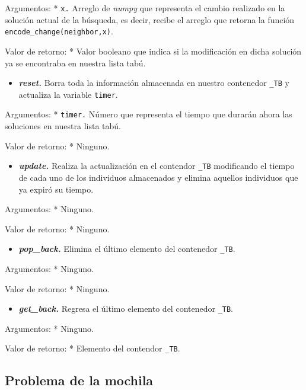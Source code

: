 \documentclass[11pt]{article}
\providecommand{\tightlist}{%
      \setlength{\itemsep}{0pt}\setlength{\parskip}{0pt}}
\begin{document}
Argumentos: * \texttt{x.} Arreglo de \emph{numpy} que representa el
cambio realizado en la solución actual de la búsqueda, es decir, recibe
el arreglo que retorna la función \texttt{encode\_change(neighbor,x)}.

Valor de retorno: * Valor booleano que indica si la modificación en
dicha solución ya se encontraba en nuestra lista tabú.

\begin{itemize}
\tightlist
\item
  \emph{\textbf{reset.}} Borra toda la información almacenada en nuestro
  contenedor \texttt{\_TB} y actualiza la variable \texttt{timer}.
\end{itemize}

Argumentos: * \texttt{timer.} Número que representa el tiempo que
durarán ahora las soluciones en nuestra lista tabú.

Valor de retorno: * Ninguno.

\begin{itemize}
\tightlist
\item
  \emph{\textbf{update.}} Realiza la actualización en el contendor
  \texttt{\_TB} modificando el tiempo de cada uno de los individuos
  almacenados y elimina aquellos individuos que ya expiró su tiempo.
\end{itemize}

Argumentos: * Ninguno.

Valor de retorno: * Ninguno.

\begin{itemize}
\tightlist
\item
  \emph{\textbf{pop\_back.}} Elimina el último elemento del contenedor
  \texttt{\_TB}.
\end{itemize}

Argumentos: * Ninguno.

Valor de retorno: * Ninguno.

\begin{itemize}
\tightlist
\item
  \emph{\textbf{get\_back.}} Regresa el último elemento del contenedor
  \texttt{\_TB}.
\end{itemize}

Argumentos: * Ninguno.

Valor de retorno: * Elemento del contendor \texttt{\_TB}.

    \subsection{Problema de la mochila}\label{problema-de-la-mochila}
\end{document}
